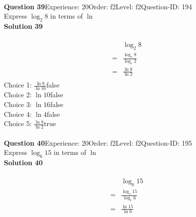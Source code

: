 \documentclass{article}
\begin{document}
\\[4pt]
\noindent\textbf{Question 39}\hspace{20pt}Experience: 20\hspace{20pt}Order: f2\hspace{20pt}Level: f2\hspace{20pt}Question-ID: 194\\[2pt]
Express $\log_{2}8$ in terms of $\ln$\\[4pt]
\noindent\textbf{Solution 39}\\[2pt]
\\[-35pt]\begin{align*}
&\log_{2}8\\[2pt]
=&\displaystyle\frac{\log_{e}8}{\log_{e}2}\\[2pt]
=&\displaystyle\frac{\ln8}{\ln2}\\[-100pt]
\end{align*}
Choice 1: \hspace{20pt}$\displaystyle\frac{\ln8}{\ln16}$\hspace{20pt}false\\
Choice 2: \hspace{20pt}$\ln{10}$\hspace{20pt}false\\
Choice 3: \hspace{20pt}$\ln{16}$\hspace{20pt}false\\
Choice 4: \hspace{20pt}$\ln{4}$\hspace{20pt}false\\
Choice 5: \hspace{20pt}$\displaystyle\frac{\ln8}{\ln2}$\hspace{20pt}true\\
\\[4pt]
\noindent\textbf{Question 40}\hspace{20pt}Experience: 20\hspace{20pt}Order: f2\hspace{20pt}Level: f2\hspace{20pt}Question-ID: 195\\[2pt]
Express $\log_{6}15$ in terms of $\ln$\\[4pt]
\noindent\textbf{Solution 40}\\[2pt]
\\[-35pt]\begin{align*}
&\log_{6}15\\[2pt]
=&\displaystyle\frac{\log_{e}15}{\log_{e}6}\\[2pt]
=&\displaystyle\frac{\ln15}{\ln6}\\[-100pt]
\end{align*}
\end{document}
